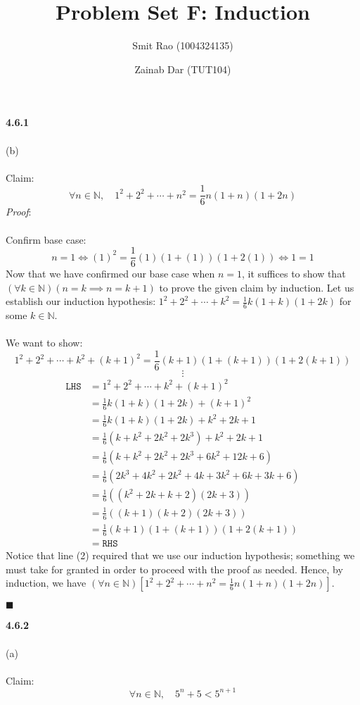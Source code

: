 \documentclass[12pt]{article}
\title{Problem Set F: Induction}
\author{Smit Rao (1004324135) 
\and Zainab Dar (TUT104)}
\begin{document}
\maketitle
\parindent=0pt
\textbf{4.6.1}\\\\
(b)\\\\
Claim:
$$\forall n \in \mathbb{N}, \quad 1^2+2^2+ \cdots +n^2 = \frac{1}{6} n(1+n)(1+2n)$$
\emph{Proof}:\\\\
Confirm base case: 
$$n=1 \iff (1)^2 = \frac{1}{6} (1) (1+(1))(1+2(1)) \iff 1 = 1$$
Now that we have confirmed our base case when $n=1$, it suffices to show that $(\forall k \in \mathbb{N})(n=k \implies n=k+1)$ to prove the given claim by induction. Let us establish our induction hypothesis: $1^2+2^2+ \cdots +k^2 = \frac{1}{6} k(1+k)(1+2k)$ for some $k \in \mathbb{N}$.\\\\
We want to show: $$\boxed{1^2+2^2+\cdots+k^2+(k+1)^2=\frac{1}{6}(k+1)(1+(k+1))(1+2(k+1))}$$
$$\vdots$$
\begin{align}
\mathtt{LHS} &= 1^2+2^2+\cdots+k^2+(k+1)^2\\
&= \frac{1}{6} k(1+k)(1+2k) + (k+1)^2\\
&= \frac{1}{6} k(1+k)(1+2k) + k^2 + 2k + 1\\
&= \frac{1}{6} (k+k^2+2k^2+2k^3)+k^2+2k+1\\
&= \frac{1}{6} (k+k^2+2k^2+2k^3+6k^2+12k+6)\\
&= \frac{1}{6} (2k^3+4k^2+2k^2+4k+3k^2+6k+3k+6)\\
&= \frac{1}{6} ((k^2+2k+k+2)(2k+3))\\
&= \frac{1}{6} ((k+1)(k+2)(2k+3))\\
&= \frac{1}{6} (k+1)(1+(k+1))(1+2(k+1))\\
&= \mathtt{RHS}
\end{align}
Notice that line (2) required that we use our induction hypothesis; something we must take for granted in order to proceed with the proof as needed. Hence, by induction, we have $(\forall n \in \mathbb{N})[1^2+2^2+ \cdots +n^2 = \frac{1}{6} n(1+n)(1+2n)]$. 
\begin{flushright}
$\blacksquare$
\end{flushright}
\textbf{4.6.2}\\\\
(a)\\\\
Claim:
$$\forall n \in \mathbb{N}, \quad 5^n+5 < 5^{n+1}$$
\end{document}
